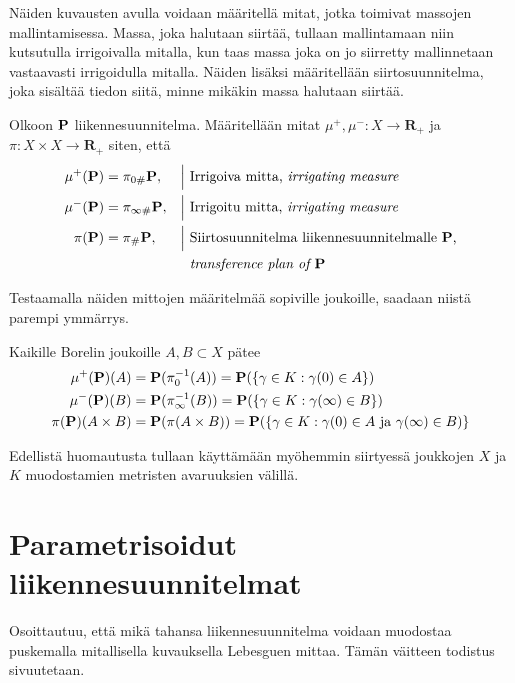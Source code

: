 \documentclass[12pt,oneside,a4paper]{amsbook} %
\begin{document}
Näiden kuvausten avulla voidaan määritellä mitat, jotka toimivat massojen mallintamisessa. Massa, joka halutaan siirtää, tullaan mallintamaan niin kutsutulla irrigoivalla mitalla, kun taas massa joka on jo siirretty mallinnetaan vastaavasti irrigoidulla mitalla. Näiden lisäksi määritellään siirtosuunnitelma, joka sisältää tiedon siitä, minne mikäkin massa halutaan siirtää.

\begin{definition}
    Olkoon $\P$ liikennesuunnitelma. Määritellään mitat $\mu^+, \mu^- : X \to \mathbf{R}_+$ ja $\pi: X\times X \to \mathbf{R}_+$ siten, että
    \begin{align*}
        \mu^+(\P) &= \pi_{0\#} \P,  &&\Big| \text{ Irrigoiva mitta, \textit{irrigating measure} }\\
        \mu^-(\P) &= \pi_{\infty \#} \P,  &&\Big| \text{ Irrigoitu mitta, \textit{irrigating measure} }\\
        \pi(\P) &= \pi_\# \P,  &&\Big| \text{ Siirtosuunnitelma liikennesuunnitelmalle $\P$,}\\ 
        & &&\hphantom{\Big|} \text{ \textit{transference plan of $\P$}}
    \end{align*}
\end{definition}

Testaamalla näiden mittojen määritelmää sopiville joukoille, saadaan niistä parempi ymmärrys.

\begin{remark}
    Kaikille Borelin joukoille $A, B \subset X$ pätee
    \begin{align*}
        \mu^+(\P)(A) &= \P(\pi_0^{-1}(A)) = \P(\{\gamma \in K : \gamma(0) \in A\}) \\
        \mu^-(\P)(B) &= \P(\pi_\infty^{-1}(B)) = \P(\{\gamma \in K : \gamma(\infty) \in B\}) \\
        \pi(\P)(A\times B) &= \P(\pi(A\times B)) = \P(\{\gamma \in K: \gamma(0) \in A\text{ ja } \gamma(\infty) \in B)\}
    \end{align*}
\end{remark}

Edellistä huomautusta tullaan käyttämään myöhemmin siirtyessä joukkojen $X$ ja $K$ muodostamien metristen avaruuksien välillä.

\section{Parametrisoidut liikennesuunnitelmat}

Osoittautuu, että mikä tahansa liikennesuunnitelma voidaan muodostaa puskemalla mitallisella kuvauksella Lebesguen mittaa. Tämän väitteen todistus sivuutetaan.
\end{document}
